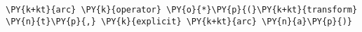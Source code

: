 \begin{Verbatim}[commandchars=\\\{\}]
    \PY{k+kt}{arc} \PY{k}{operator} \PY{o}{*}\PY{p}{(}\PY{k+kt}{transform} \PY{n}{t}\PY{p}{,} \PY{k}{explicit} \PY{k+kt}{arc} \PY{n}{a}\PY{p}{)}
\end{Verbatim}

